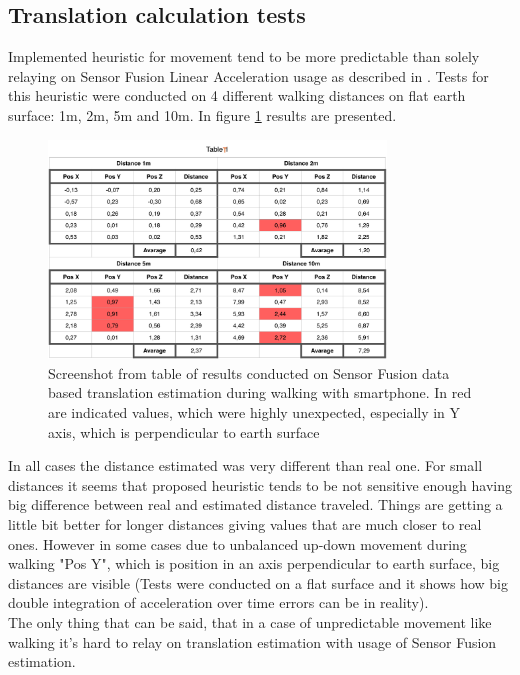 \subsection{Translation calculation tests}
Implemented heuristic for movement tend to be more predictable than solely relaying on Sensor Fusion Linear Acceleration usage as described in \cite{indoorPosition}. Tests for this heuristic were conducted on 4 different walking distances on flat earth surface: 1m, 2m, 5m and 10m. In figure \ref{fig:distance_tests} results are presented.
\begin{figure}[h!]
    \centering
    \includegraphics[width=0.8\textwidth]{distance_tests}
    \caption{Screenshot from table of results conducted on Sensor Fusion data based translation estimation during walking with smartphone. In red are indicated values, which were highly unexpected, especially in Y axis, which is perpendicular to earth surface}
    \label{fig:distance_tests}
\end{figure}
In all cases the distance estimated was very different than real one. For small distances it seems that proposed heuristic tends to be not sensitive enough having big difference between real and estimated distance traveled. Things are getting a little bit better for longer distances giving values that are much closer to real ones. However in some cases due to unbalanced up-down movement during walking "Pos Y", which is position in an axis perpendicular to earth surface, big distances are visible (Tests were conducted on a flat surface and it shows how big double  integration of acceleration over time errors can be in reality). \\
The only thing that can be said, that in a case of unpredictable movement like walking it's hard to relay on translation estimation with usage of Sensor Fusion estimation. 
